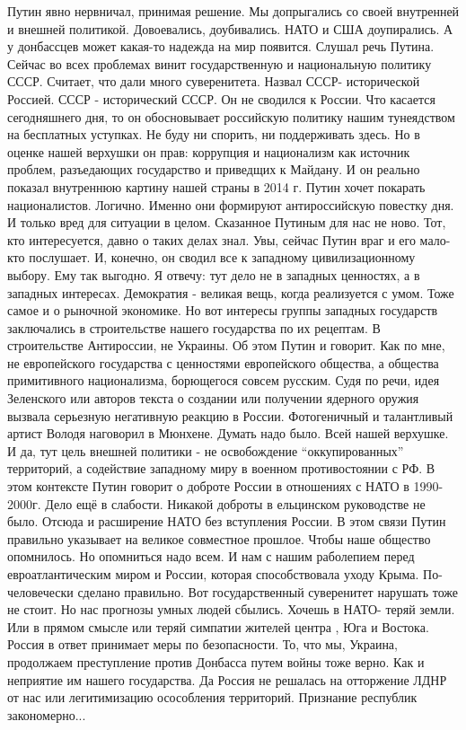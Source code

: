 Путин явно нервничал, принимая решение. Мы допрыгались со своей внутренней и
внешней политикой. Довоевались, доубивались. НАТО и США доупирались. А у
донбассцев может какая-то надежда на мир появится. Слушал речь Путина. Сейчас
во всех проблемах винит государственную  и национальную политику СССР. Считает,
что дали много суверенитета. Назвал СССР- исторической Россией. СССР -
исторический СССР. Он не сводился к России. Что касается сегодняшнего дня, то
он обосновывает российскую политику нашим тунеядством на бесплатных уступках.
Не буду ни спорить, ни поддерживать здесь. Но в оценке нашей верхушки он прав:
коррупция и национализм как источник проблем, разъедающих государство и
приведщих к Майдану. И он реально показал внутреннюю картину нашей страны в
2014 г. Путин хочет покарать националистов. Логично. Именно они формируют
антироссийскую повестку дня. И только вред для ситуации в целом. Сказанное
Путиным для нас не ново. Тот, кто  интересуется, давно о таких делах знал. Увы,
сейчас Путин враг и его мало-кто послушает. И, конечно, он сводил все к
западному цивилизационному выбору. Ему так выгодно. Я отвечу: тут дело не в
западных ценностях, а в западных интересах. Демократия - великая вещь, когда
реализуется с умом. Тоже самое и о рыночной экономике. Но вот интересы группы
западных государств заключались в строительстве нашего государства по их
рецептам. В строительстве Антироссии, не Украины. Об этом Путин и говорит. Как
по мне, не европейского государства с ценностями европейского общества, а
общества примитивного национализма, борющегося совсем русским.  Судя по речи,
идея Зеленского или авторов текста о создании или получении ядерного оружия
вызвала серьезную негативную реакцию в России. Фотогеничный и талантливый
артист Володя наговорил в Мюнхене. Думать надо было. Всей нашей верхушке. И да,
тут цель внешней политики - не освобождение \enquote{оккупированных} территорий, а
содействие западному миру в военном противостоянии с РФ. В этом контексте Путин
говорит о доброте России в отношениях с НАТО в 1990-2000г. Дело ещё в слабости.
Никакой доброты в ельцинском руководстве не было. Отсюда и расширение НАТО без
вступления России. В этом связи Путин правильно указывает на великое совместное
прошлое. Чтобы наше общество опомнилось. Но опомниться надо всем. И нам с нашим
раболепием перед евроатлантическим миром и России, которая способствовала уходу
Крыма. По-человечески сделано правильно. Вот государственный суверенитет
нарушать тоже не стоит. Но нас  прогнозы умных людей сбылись. Хочешь в НАТО-
теряй земли. Или в прямом смысле или теряй симпатии жителей центра , Юга и
Востока. Россия в ответ принимает меры по безопасности. То, что мы, Украина,
продолжаем преступление против Донбасса путем войны тоже верно. Как и неприятие
им нашего государства. Да Россия не решалась на отторжение ЛДНР от нас или
легитимизацию осособления территорий. Признание республик закономерно... 
